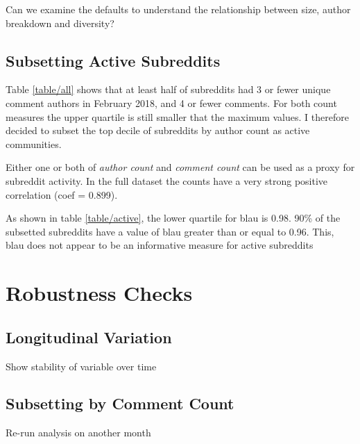 \documentclass{article}
\begin{document}
Can we examine the defaults to understand the relationship between size, author breakdown and diversity?



\subsection{Subsetting Active Subreddits}
Table \ref{table/all} shows that at least half of subreddits had 3 or fewer unique comment authors in February 2018, and 4 or fewer comments. For both count measures the upper quartile is still smaller that the maximum values. I therefore decided to subset the top decile of subreddits by author count as active communities.

Either one or both of \textit{author count} and \textit{comment count} can be used as a proxy for subreddit activity. In the full dataset the counts have a very strong positive correlation (coef = 0.899). 

As shown in table \ref{table/active}, the lower quartile for blau is 0.98. 90\% of the subsetted subreddits have a value of blau greater than or equal to 0.96.  This, blau does not appear to be an informative measure for active subreddits








%







\section{Robustness Checks}

\subsection{Longitudinal Variation}

Show stability of variable over time

\subsection{Subsetting by Comment Count}

Re-run analysis on another month
\end{document}
